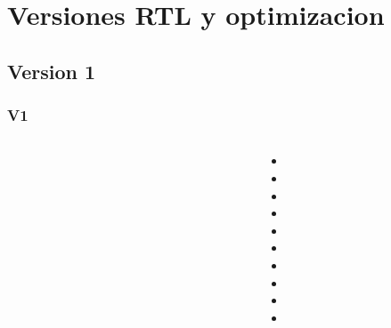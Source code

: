 \documentclass[t]{beamer}
\begin{document}
\section{Versiones RTL y optimizacion}

\subsection{Version 1}
\begin{frame}
\frametitle{V1}	

\begin{columns}[T] %
\hspace*{-0.6cm}
\begin{column}{.7\textwidth}
\vspace*{-0.7cm}
\begin{figure}
\end{figure}
\end{column}%

\begin{column}{.3\textwidth}

\begin{itemize}
\item
\item
\item
\item
\item
\item
\item
\item
\item
\item
\end{itemize}

\end{column}
\end{columns}

\end{frame}
\end{document}
